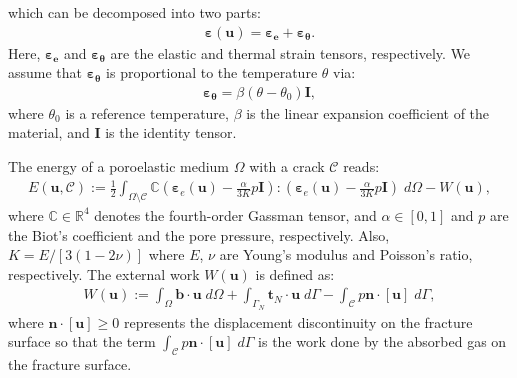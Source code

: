 which can be decomposed into two parts:
\begin{equation}\label{Eq:epsilon_decomp}
\begin{aligned}
	\bm{\varepsilon}(\bm{u}) = \bm{\varepsilon_e}+\bm{\varepsilon_{\theta}}.
\end{aligned}
\end{equation}
Here, $\bm{\varepsilon_e}$ and $\bm{\varepsilon_{\theta}}$ are the elastic and thermal strain tensors, respectively. We assume that $\bm{\varepsilon_{\theta}}$ is proportional to the temperature $\theta$ via:
\begin{equation}\label{Eq:epsilon_theta}
	\begin{aligned}
		\bm{\varepsilon_{\theta}} = \beta(\theta-\theta_0)\mathbf{I},
	\end{aligned}
	\end{equation}
where $\theta_0$ is a reference temperature, $\beta$ is the linear expansion coefficient of the material, and $\mathbf{I}$ is the  identity tensor.

The energy of a poroelastic medium $\Omega$ with a crack $\mathcal{C}$ reads:
\begin{equation}\label{Eq:E}
\begin{aligned}
E(\bm{u},\mathcal{C}):= \frac12 \int_{\Omega\setminus\mathcal{C}} \mathbb{C}\left(\bm{\varepsilon}_e(\bm{u})-\frac{\alpha}{3K}p\mathbf{I}\right):\left(\bm{\varepsilon}_e(\bm{u})-\frac{\alpha}{3K}p\mathbf{I}\right)\; d\Omega - W(\bm{u}),
\end{aligned}
\end{equation}
where $\mathbb{C}\in\mathbb{R}^4$ denotes the fourth-order Gassman tensor, and $\alpha\in[0,1]$ and $p$ are the Biot's coefficient and the pore pressure, respectively. Also, $K=E/[3(1-2\nu)]$ where $E$, $\nu$ are Young's modulus and Poisson's ratio, respectively.
The external work $W(\bm{u})$ is defined as:
\begin{equation}\label{Eq:External}
	\begin{aligned}
		W(\bm{u}):=\int_{\Omega} \bm{b} \cdot \bm{u} \; d\Omega+\int_{\Gamma_N} \bm{t}_N\cdot \bm{u} \; d\Gamma - \int_{\mathcal{C}} p\bm{n}\cdot[\bm{u}] \; d\Gamma,
	\end{aligned}
\end{equation}
where $\bm{n}\cdot[\bm{u}]\geq 0$ represents the displacement discontinuity on the fracture surface so that the term $\int_{\mathcal{C}} p\bm{n}\cdot[\bm{u}] \; d\Gamma$
is the work done by the absorbed gas on the fracture surface.

